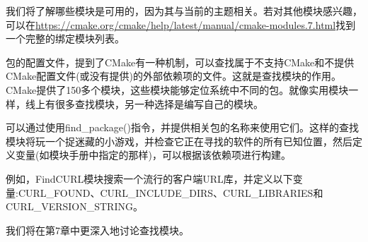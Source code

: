 我们将了解哪些模块是可用的，因为其与当前的主题相关。若对其他模块感兴趣，可以在\url{https://cmake.org/cmake/help/latest/manual/cmake-modules.7.html}找到一个完整的绑定模块列表。


包的配置文件，提到了CMake有一种机制，可以查找属于不支持CMake和不提供CMake配置文件(或没有提供)的外部依赖项的文件。这就是查找模块的作用。CMake提供了150多个模块，这些模块能够定位系统中不同的包。就像实用模块一样，线上有很多查找模块，另一种选择是编写自己的模块。

可以通过使用find\_package()指令，并提供相关包的名称来使用它们。这样的查找模块将玩一个捉迷藏的小游戏，并检查它正在寻找的软件的所有已知位置，然后定义变量(如模块手册中指定的那样)，可以根据该依赖项进行构建。

例如，FindCURL模块搜索一个流行的客户端URL库，并定义以下变量:CURL\_FOUND、CURL\_INCLUDE\_DIRS、CURL\_LIBRARIES和CURL\_VERSION\_STRING。

我们将在第7章中更深入地讨论查找模块。








